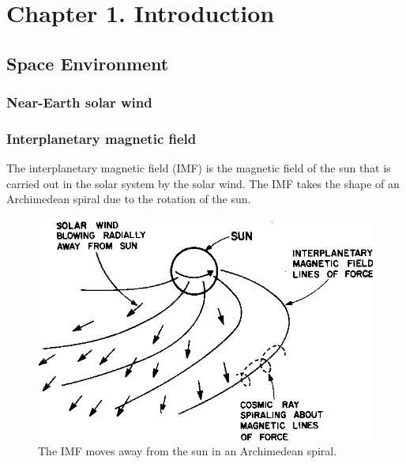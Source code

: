 \chapter{Chapter 1. Introduction}

\section{Space Environment}
\subsection{Near-Earth solar wind}
\subsection{Interplanetary magnetic field}
The interplanetary magnetic field (\gls{IMF}) is the magnetic field of the sun that is carried out in the solar system by the solar wind. The IMF takes the shape of an Archimedean spiral due to the rotation of the sun.

\begin{figure}
    \centering
    \includegraphics[width=\linewidth]{Figures/IMF.png}
    \caption[Diagram of the interplanetary magnetic field]{The IMF moves away from the sun in an Archimedean spiral.}
    \label{fig:IMF-spiral}
\end{figure}

